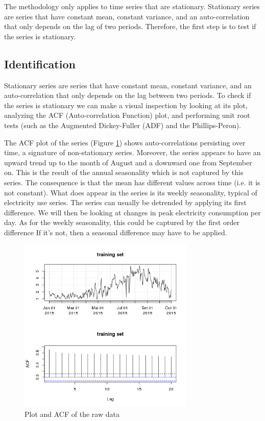 The methodology only applies to time series that are stationary. Stationary series are series that have constant mean, constant variance, and an auto-correlation that only depends on the lag of two periods. Therefore, the first step is to test if the series is stationary. 

\subsection{Identification}

Stationary series are series that have constant mean, constant variance, and an auto-correlation that only depends on the lag between two periods. To check if the series is stationary we can make a visual inspection by looking at its plot, analyzing the ACF (Auto-correlation Function) plot, and performing unit root tests (such as the Augmented Dickey-Fuller (ADF) and the Phillips-Peron).

The ACF plot of the series (Figure \ref{fig:raw_series_plot_acf}) shows auto-correlations persisting over time, a signature of non-stationary series. Moreover, the series appears to have an upward trend up to the month of August and a downward one from September on.  This is the result of the annual seasonality which is not captured by this series. The consequence is that the mean has different values across time (i.e. it is not constant). What does appear in the series is its weekly seasonality, typical of electricity use series. The series can usually be detrended by applying its first difference. We will then be looking at changes in peak electricity consumption per day. As for the weekly seasonality, this could be captured by the first order difference If it’s not, then a seasonal difference may have to be applied. 

\begin{figure}[!htb]
\begin{center}
\includegraphics[width=8.4cm]{raw_series_plot_acf.png}    %
\caption{Plot and ACF of the raw data} 
\label{fig:raw_series_plot_acf}
\end{center}
\end{figure}


